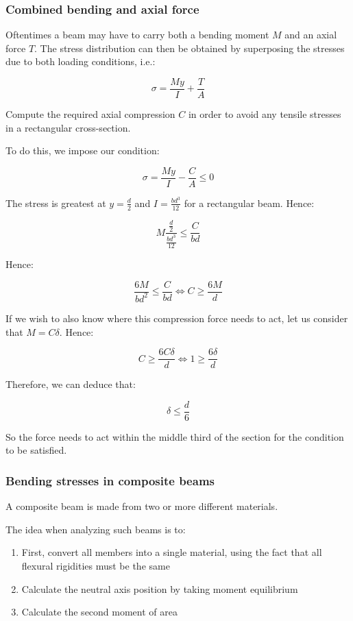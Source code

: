 \documentclass{article}
\begin{document}
\subsubsection{Combined bending and axial force}

Oftentimes a beam may have to carry both a bending moment $M$ and an axial force $T$. The stress distribution can then be obtained by superposing the stresses due to both loading conditions, i.e.:

\[ \sigma = \frac{My}{I} + \frac{T}{A} \]

\begin{example}
    Compute the required axial compression $C$ in order to avoid any tensile stresses in a rectangular cross-section.

    To do this, we impose our condition:

    \[ \sigma = \frac{My}{I} - \frac{C}{A} \leq 0 \]

    The stress is greatest at $y = \frac{d}{2}$ and $I = \frac{bd^3}{12}$ for a rectangular beam. Hence:

    \[ M\frac{\frac{d}{2}}{\frac{bd^3}{12}} \leq \frac{C}{bd} \]

    Hence:

    \[ \frac{6M}{bd^2} \leq \frac{C}{bd} \iff C \geq \frac{6M}{d} \]

    If we wish to also know where this compression force needs to act, let us consider that $M = C\delta$. Hence:

    \[ C \geq \frac{6C\delta}{d} \iff 1 \geq \frac{6\delta}{d} \]

    Therefore, we can deduce that:

    \[ \delta \leq \frac{d}{6} \]

    So the force needs to act within the middle third of the section for the condition to be satisfied.
\end{example}

\subsubsection{Bending stresses in composite beams}

\begin{definition}
    A composite beam is made from two or more different materials.
\end{definition}

The idea when analyzing such beams is to:

\begin{enumerate}
    \item First, convert all members into a single material, using the fact that all flexural rigidities must be the same
    \item Calculate the neutral axis position by taking moment equilibrium
    \item Calculate the second moment of area
\end{enumerate}
\end{document}
